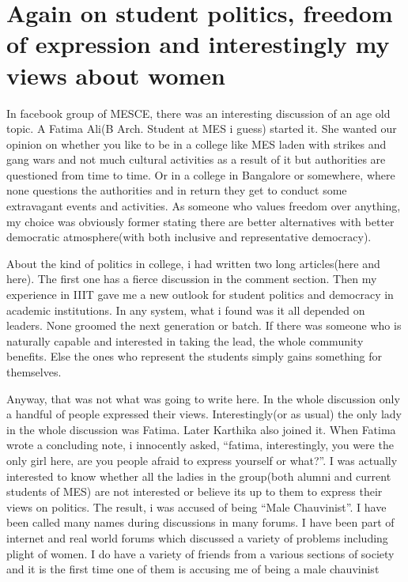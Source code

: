 \section*{Again on student politics, freedom of expression and interestingly my views about women}
\vskip 2pt

In facebook group of MESCE, there was an interesting discussion of an age old topic. A Fatima Ali(B Arch. Student at MES i guess) started it. She wanted our opinion on whether you like to be in a college like MES laden with strikes and gang wars and not much cultural activities as a result of it but authorities are questioned from time to time. Or in a college in Bangalore or somewhere, where none questions the authorities and in return they get to conduct some extravagant events and activities. As someone who values freedom over anything, my choice was obviously former stating there are better alternatives with better democratic atmosphere(with both inclusive and representative democracy).

About the kind of politics in college, i had written two long articles(here and here). The first one has a fierce discussion in the comment section. Then my experience in IIIT gave me a new outlook for student politics and democracy in academic institutions. In any system, what i found was it all depended on leaders. None groomed the next generation or batch. If there was someone who is naturally capable and interested in taking the lead, the whole community benefits. Else the ones who represent the students simply gains something for themselves.

Anyway, that was not what was going to write here. In the whole discussion only a handful of people expressed their views. Interestingly(or as usual) the only lady in the whole discussion was Fatima. Later Karthika also joined it. When Fatima wrote a concluding note, i innocently asked, “fatima, interestingly, you were the only girl here, are you people afraid to express yourself or what?”. I was actually interested to know whether all the ladies in the group(both alumni and current students of MES) are not interested or believe its up to them to express their views on politics. The result, i was accused of being “Male Chauvinist”. I have been called many names during discussions in many forums. I have been part of internet and real world forums which discussed a variety of problems including plight of women. I do have a variety of friends from a various sections of society and it is the first time one of them is accusing me of being a male chauvinist

